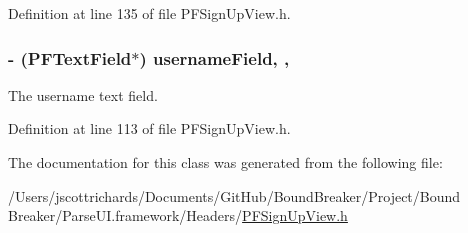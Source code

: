 Definition at line 135 of file P\+F\+Sign\+Up\+View.\+h.

\hypertarget{interface_p_f_sign_up_view_a87cd8eb60bc9201825a00f98630736f3}{}
\subsubsection[{username\+Field}]{\setlength{\rightskip}{0pt plus 5cm}-\/ ({\bf P\+F\+Text\+Field}$\ast$) username\+Field\hspace{0.3cm}{\ttfamily [read]}, {\ttfamily [nonatomic]}, {\ttfamily [strong]}}\label{interface_p_f_sign_up_view_a87cd8eb60bc9201825a00f98630736f3}
The username text field. 

Definition at line 113 of file P\+F\+Sign\+Up\+View.\+h.



The documentation for this class was generated from the following file\+:\begin{DoxyCompactItemize}
\item 
/\+Users/jscottrichards/\+Documents/\+Git\+Hub/\+Bound\+Breaker/\+Project/\+Bound Breaker/\+Parse\+U\+I.\+framework/\+Headers/\hyperlink{_p_f_sign_up_view_8h}{P\+F\+Sign\+Up\+View.\+h}\end{DoxyCompactItemize}
